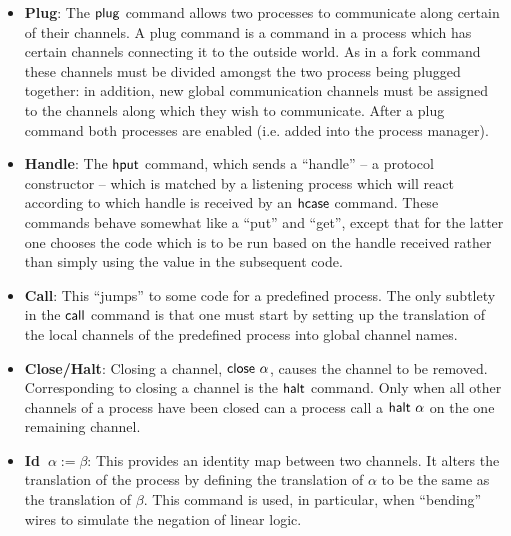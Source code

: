 \documentclass[11pt]{article}
\newcommand{\<}{\langle}
\renewcommand{\>}{\rangle}
\begin{document}
\begin{itemize}
\item {\bf Plug}: The ${\sf plug}$ command allows two processes to communicate along certain of their channels. A plug command is a command in a process which has certain channels connecting it to the outside world.  As in a fork command 
these channels must be divided amongst the two process being plugged together: in addition, new global communication channels must be assigned to the channels along which they wish to communicate. After a plug command both 
processes are enabled (i.e. added into the process manager).

\item {\bf Handle}: The ${\sf hput}$ command, which sends a ``handle'' -- a protocol constructor -- which is matched by a listening process which will react according to which handle is received by an ${\sf hcase}$ command.  These commands behave 
somewhat like a ``put''  and ``get'', except that for the latter one chooses the code which is to be run based on the handle received rather than simply using the value in the subsequent code.

\item {\bf Call}: This ``jumps'' to some code for a predefined process.  The only subtlety in the ${\sf call}$ command is that one must start by setting up the translation of the local channels of the predefined process into global channel names.

\item {\bf Close/Halt}: Closing a channel, ${\sf close}~\alpha$, causes the channel to be removed.  Corresponding to closing a channel is the ${\sf halt}$ command.  Only when all other channels of a process have been closed can a process call a ${\sf halt} ~\alpha$ on the one remaining channel.

\item {\bf Id~$\alpha := \beta$}: This provides an identity map between two channels.  It alters the translation of the process by defining the translation of $\alpha$ to be the same as the translation of $\beta$.   This command is used, in particular, when ``bending'' wires to simulate the negation of linear logic.
\end {itemize}
\end{document}
